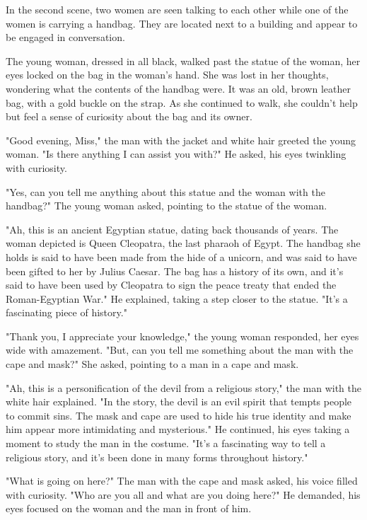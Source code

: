 \documentclass[smalldemyvopaper,11pt,twoside,onecolumn,openright,extrafontsizes]{memoir}
\begin{document}
In the second scene, two women are seen talking to each other while one of the women is carrying a handbag. They are located next to a building and appear to be engaged in conversation.\par
The young woman, dressed in all black, walked past the statue of the woman, her eyes locked on the bag in the woman's hand. She was lost in her thoughts, wondering what the contents of the handbag were. It was an old, brown leather bag, with a gold buckle on the strap. As she continued to walk, she couldn't help but feel a sense of curiosity about the bag and its owner.\par
"Good evening, Miss," the man with the jacket and white hair greeted the young woman. "Is there anything I can assist you with?" He asked, his eyes twinkling with curiosity.\par
"Yes, can you tell me anything about this statue and the woman with the handbag?" The young woman asked, pointing to the statue of the woman.\par
"Ah, this is an ancient Egyptian statue, dating back thousands of years. The woman depicted is Queen Cleopatra, the last pharaoh of Egypt. The handbag she holds is said to have been made from the hide of a unicorn, and was said to have been gifted to her by Julius Caesar. The bag has a history of its own, and it's said to have been used by Cleopatra to sign the peace treaty that ended the Roman-Egyptian War." He explained, taking a step closer to the statue. "It's a fascinating piece of history."\par
"Thank you, I appreciate your knowledge," the young woman responded, her eyes wide with amazement. "But, can you tell me something about the man with the cape and mask?" She asked, pointing to a man in a cape and mask.\par
"Ah, this is a personification of the devil from a religious story," the man with the white hair explained. "In the story, the devil is an evil spirit that tempts people to commit sins. The mask and cape are used to hide his true identity and make him appear more intimidating and mysterious." He continued, his eyes taking a moment to study the man in the costume. "It's a fascinating way to tell a religious story, and it's been done in many forms throughout history."\par
"What is going on here?" The man with the cape and mask asked, his voice filled with curiosity. "Who are you all and what are you doing here?" He demanded, his eyes focused on the woman and the man in front of him.\par
\end{document}
